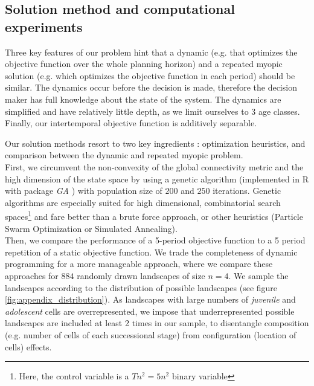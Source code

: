 \subsection{Solution method and computational experiments}

Three key features of our problem hint that a dynamic (e.g. that optimizes the objective function over the whole planning horizon) and a repeated myopic solution (e.g. which optimizes the objective function in each period)  should be similar. The dynamics occur before the decision is made, therefore the decision maker has full knowledge about the state of the system. The dynamics are simplified and have relatively little depth, as we limit ourselves to 3 age classes. Finally, our intertemporal objective function is additively separable.

Our solution methods resort to two key ingredients : optimization heuristics, and comparison between the dynamic and repeated myopic problem. \\
First, we circumvent the non-convexity of the global connectivity metric and the high dimension of the state space by using a genetic algorithm \citep{holland_adaptation_1975} (implemented in \textsf{R} with package \textit{GA} \citep{GA_2017}) with population size of $200$ and $250$ iterations. Genetic algorithms are especially suited for high dimensional, combinatorial search spaces\footnote{Here, the control variable is a $Tn^2 = 5n^2$ binary variable} and fare better than a brute force approach, or other heuristics (Particle Swarm Optimization or Simulated Annealing). 
\\
Then, we compare the performance of a 5-period objective function to a 5 period repetition of a static objective function. We trade the completeness of dynamic programming for a more manageable approach, where we compare these approaches for %
$884$ randomly drawn landscapes of size $n=4$.
We sample the landscapes according to the 
distribution of possible landscapes (see figure \ref{fig:appendix_distribution}). As landscapes with large numbers of \textit{juvenile} and \textit{adolescent} cells are overrepresented, we impose that underrepresented possible landscapes are included at least 2 times in our sample, to disentangle composition (e.g. number of cells of each successional stage) from configuration (location of cells) effects.

